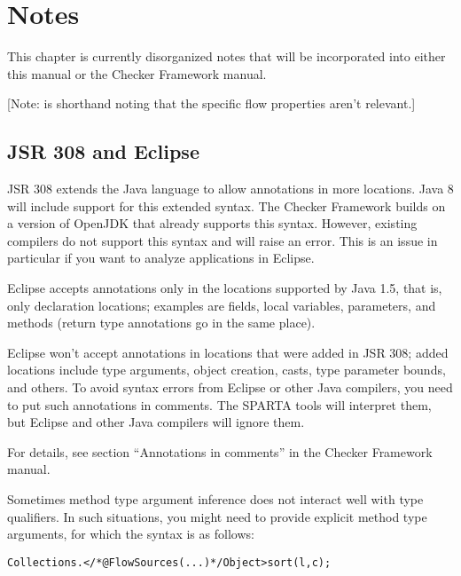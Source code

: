 \htmlhr
\chapter{Notes\label{notes}}

This chapter is currently disorganized notes that will be incorporated into
either this manual or the Checker Framework manual.

[Note: \srcsome{} is shorthand noting that the specific flow
properties aren't relevant.]


\section{JSR 308 and Eclipse}

JSR 308 extends the Java language to allow annotations in more
locations. Java 8 will include support for this extended syntax.
The Checker Framework builds on a version of OpenJDK that already
supports this syntax.
However, existing compilers do not support this syntax and will raise
an error. This is an issue in particular if you want to analyze
applications in Eclipse.

Eclipse accepts annotations only in the locations supported by Java
1.5, that is, only declaration locations; examples are fields, local
variables, parameters, and methods (return type annotations go in the same
place).

Eclipse won't accept annotations in locations that were added in
JSR 308; added locations include type arguments, object creation,
casts, type parameter bounds, and others.
To avoid syntax errors from Eclipse or other Java compilers, you need
to put such annotations in comments.
The SPARTA tools will interpret them, but Eclipse and other Java compilers
will ignore them.

For details, see section ``Annotations in comments'' in the Checker Framework manual.



Sometimes method type argument inference does not interact well with
type qualifiers. In such situations, you might need to provide
explicit method type arguments, for which the syntax is as follows:

\begin{alltt}
	Collections.</*@FlowSources({...})*/ Object>sort(l, c);
\end{alltt}


